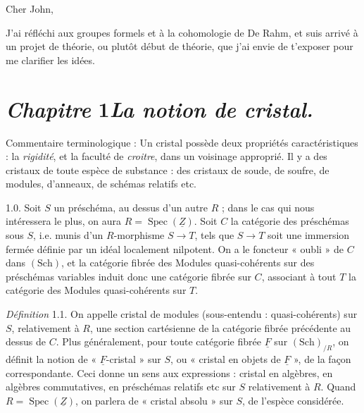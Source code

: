 \documentclass[11pt,a4paper]{article}
\begin{document}

Cher John,

J'ai réfléchi aux groupes formels et à la cohomologie de De Rahm, et suis
arrivé à un projet de théorie, ou plutôt  début de théorie, que j'ai envie de
t'exposer\add{,} pour me clarifier les idées.

\section*{\emph{Chapitre} 1\quad \emph{La notion de cristal.}}

Commentaire terminologique : Un cristal possède deux propriétés caractéristiques :
la \emph{rigidité}, et la faculté de \emph{croitre}, dans un voisinage approprié.
Il y a des cristaux de toute espèce de substance : des cristaux de soude, de
soufre, de modules, d'anneaux, de schémas relatifs etc.

1.0.
Soit $S$ un préschéma, au dessus d'un autre $R$ ; dans le cas qui nous
intéressera le plus, on aura $R=\operatorname{Spec}(\underline{Z})$. Soit $C$ la
catégorie des préschémas  sous $S$, \add{(}i.e. munis d'un
$R$-morphisme $S\to T$,\add{)} tels que $S\to T$ soit une immersion fermée
définie par un idéal localement nilpotent.
On a le foncteur « oubli » de $C$ dans $(\mathrm{Sch})$, et la catégorie fibrée
des Modules quasi-cohérents sur des préschémas variables induit donc une
catégorie fibrée sur $C$, associant à tout $T$ la catégorie des Modules
quasi-cohérents sur $T$.

\emph{Définition} 1.1. On appelle cristal de modules (sous-entendu :
quasi-cohérents) sur $S$, relativement à $R$, une section cartésienne de la
catégorie fibrée précédente au dessus de $C$. Plus généralement, pour toute
catégorie fibrée $\underline{F}$ sur $(\mathrm{Sch})_{/R}$, on définit la
notion de « $\underline{F}$-cristal » sur $S$, ou « cristal en objets de
$\underline{F}$ », de la façon correspondante. Ceci donne un sens aux
expressions : cristal en algèbres, en algèbres commutatives, en préschémas
relatifs etc\add{,} sur $S$ relativement à $R$. Quand
$R=\operatorname{Spec}(\underline{Z})$, on parlera de « cristal absolu » sur
$S$, de l'espèce considérée.
\end{document}
